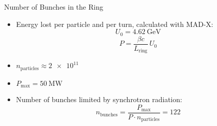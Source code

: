 \documentclass{beamer}
\begin{document}
\begin{frame}[t,fragile]{Number of Bunches in the Ring}
\begin{itemize}
   \item Energy lost per particle and per turn, calculated with MAD-X:
      \begin{equation*}
         U_0= \SI{4.62}{\GeV}
      \end{equation*}
\begin{equation*}
   P=\frac{\beta c}{L_{\textrm{ring}}}\,U_0
\end{equation*}
   \item $n_\text{particles} \approx \num{2e11}$
   \item $P_\text{max} = \SI{50}{\mega\watt}$
   \item Number of bunches limited by synchrotron radiation:
\begin{equation*}
n_\text{bunches} = \frac{P_\text{max}}{P\cdot n_\text{particles}} = 122
\end{equation*}
\end{itemize}
\end{frame}
\end{document}
